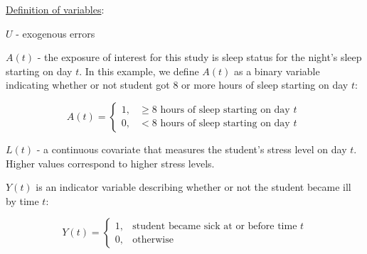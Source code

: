 \documentclass[answers]{exam}
\newenvironment{packed_item}{
\begin{itemize}
 \setlength{\itemsep}{0pt}
  \setlength{\parskip}{0pt}
  \setlength{\parsep}{0pt}
}{\end{itemize}}
\begin{document}
\underline{Definition of variables}:
\begin{packed_item}
\item[] $U$ - exogenous errors
\item[] $A(t)$ - the exposure of interest for this study is sleep status for the night's sleep starting on day $t$. In this example, we define $A(t)$ as a binary variable indicating whether or not student got 8 or more hours of sleep starting on day $t$:

  \begin{equation*}
    A(t)=
    \begin{cases}
      1, & \geq 8 \text{ hours of sleep starting on day $t$}\ \\
      0, & < 8 \text{ hours of sleep starting on day $t$}
    \end{cases}
  \end{equation*}
  
\item[] $L(t)$ - a continuous covariate that measures the student's stress level on day $t$. Higher values correspond to higher stress levels.
\item[] $Y(t)$ is an indicator variable describing whether or not the student became ill by time $t$:

  \begin{equation*}
    Y(t)=
    \begin{cases}
      1, & \text{student became sick at or before time $t$} \\
      0, & \text{otherwise}
    \end{cases}
  \end{equation*}
\end{packed_item}
\end{document}
